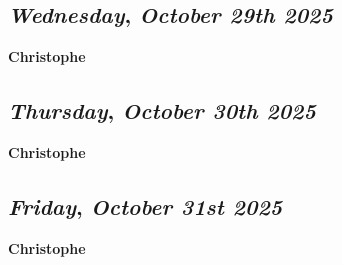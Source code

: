 \def\day{\textit{October 29th 2025}}
\def\weekday{\textit{Wednesday}}
\subsection*{\weekday, \day}
\textbf {Christophe}

\def\day{\textit{October 30th 2025}}
\def\weekday{\textit{Thursday}}
\subsection*{\weekday, \day}
\textbf {Christophe}

\def\day{\textit{October 31st 2025}}
\def\weekday{\textit{Friday}}
\subsection*{\weekday, \day}
\textbf {Christophe}
